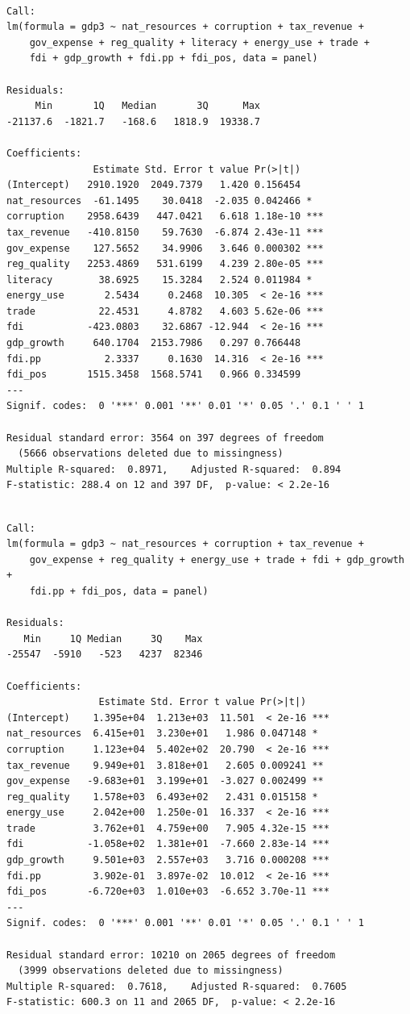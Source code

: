 \documentclass[
  letterpaper,
  DIV=11,
  numbers=noendperiod]{scrartcl}
\begin{document}
\begin{verbatim}

Call:
lm(formula = gdp3 ~ nat_resources + corruption + tax_revenue + 
    gov_expense + reg_quality + literacy + energy_use + trade + 
    fdi + gdp_growth + fdi.pp + fdi_pos, data = panel)

Residuals:
     Min       1Q   Median       3Q      Max 
-21137.6  -1821.7   -168.6   1818.9  19338.7 

Coefficients:
               Estimate Std. Error t value Pr(>|t|)    
(Intercept)   2910.1920  2049.7379   1.420 0.156454    
nat_resources  -61.1495    30.0418  -2.035 0.042466 *  
corruption    2958.6439   447.0421   6.618 1.18e-10 ***
tax_revenue   -410.8150    59.7630  -6.874 2.43e-11 ***
gov_expense    127.5652    34.9906   3.646 0.000302 ***
reg_quality   2253.4869   531.6199   4.239 2.80e-05 ***
literacy        38.6925    15.3284   2.524 0.011984 *  
energy_use       2.5434     0.2468  10.305  < 2e-16 ***
trade           22.4531     4.8782   4.603 5.62e-06 ***
fdi           -423.0803    32.6867 -12.944  < 2e-16 ***
gdp_growth     640.1704  2153.7986   0.297 0.766448    
fdi.pp           2.3337     0.1630  14.316  < 2e-16 ***
fdi_pos       1515.3458  1568.5741   0.966 0.334599    
---
Signif. codes:  0 '***' 0.001 '**' 0.01 '*' 0.05 '.' 0.1 ' ' 1

Residual standard error: 3564 on 397 degrees of freedom
  (5666 observations deleted due to missingness)
Multiple R-squared:  0.8971,    Adjusted R-squared:  0.894 
F-statistic: 288.4 on 12 and 397 DF,  p-value: < 2.2e-16
\end{verbatim}

\begin{verbatim}

Call:
lm(formula = gdp3 ~ nat_resources + corruption + tax_revenue + 
    gov_expense + reg_quality + energy_use + trade + fdi + gdp_growth + 
    fdi.pp + fdi_pos, data = panel)

Residuals:
   Min     1Q Median     3Q    Max 
-25547  -5910   -523   4237  82346 

Coefficients:
                Estimate Std. Error t value Pr(>|t|)    
(Intercept)    1.395e+04  1.213e+03  11.501  < 2e-16 ***
nat_resources  6.415e+01  3.230e+01   1.986 0.047148 *  
corruption     1.123e+04  5.402e+02  20.790  < 2e-16 ***
tax_revenue    9.949e+01  3.818e+01   2.605 0.009241 ** 
gov_expense   -9.683e+01  3.199e+01  -3.027 0.002499 ** 
reg_quality    1.578e+03  6.493e+02   2.431 0.015158 *  
energy_use     2.042e+00  1.250e-01  16.337  < 2e-16 ***
trade          3.762e+01  4.759e+00   7.905 4.32e-15 ***
fdi           -1.058e+02  1.381e+01  -7.660 2.83e-14 ***
gdp_growth     9.501e+03  2.557e+03   3.716 0.000208 ***
fdi.pp         3.902e-01  3.897e-02  10.012  < 2e-16 ***
fdi_pos       -6.720e+03  1.010e+03  -6.652 3.70e-11 ***
---
Signif. codes:  0 '***' 0.001 '**' 0.01 '*' 0.05 '.' 0.1 ' ' 1

Residual standard error: 10210 on 2065 degrees of freedom
  (3999 observations deleted due to missingness)
Multiple R-squared:  0.7618,    Adjusted R-squared:  0.7605 
F-statistic: 600.3 on 11 and 2065 DF,  p-value: < 2.2e-16
\end{verbatim}
\end{document}
